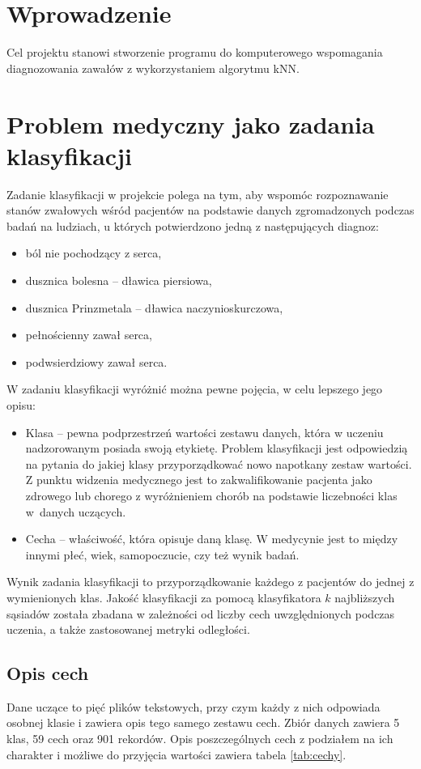 \section{Wprowadzenie}
Cel projektu stanowi stworzenie programu do komputerowego wspomagania diagnozowania zawałów z wykorzystaniem algorytmu kNN.

\section{Problem medyczny jako zadania klasyfikacji}
Zadanie klasyfikacji w projekcie polega na tym, aby wspomóc rozpoznawanie stanów zwałowych wśród pacjentów na podstawie danych zgromadzonych podczas badań na ludziach, u których potwierdzono jedną z następujących diagnoz:

\begin{itemize}
    \item ból nie pochodzący z serca,
    \item dusznica bolesna – dławica piersiowa,
    \item dusznica Prinzmetala – dławica naczynioskurczowa,
    \item pełnościenny zawał serca,
    \item podwsierdziowy zawał serca.
\end{itemize}

\noindent
W zadaniu klasyfikacji wyróżnić można pewne pojęcia, w celu lepszego jego opisu:

\begin{itemize}
    \item Klasa – pewna podprzestrzeń wartości zestawu danych, która w uczeniu nadzorowanym posiada swoją etykietę. Problem klasyfikacji jest odpowiedzią na pytania do jakiej klasy przyporządkować nowo napotkany zestaw wartości. Z punktu widzenia medycznego jest to zakwalifikowanie pacjenta jako zdrowego lub chorego z wyróżnieniem chorób na podstawie liczebności klas w~danych uczących.

    \item Cecha – właściwość, która opisuje daną klasę. W medycynie jest to między innymi płeć, wiek, samopoczucie, czy też wynik badań.
\end{itemize}

Wynik zadania klasyfikacji to przyporządkowanie każdego z pacjentów do jednej z wymienionych klas. Jakość klasyfikacji za pomocą klasyfikatora $k$ najbliższych sąsiadów została zbadana w zależności od liczby cech uwzględnionych podczas uczenia, a także zastosowanej metryki odległości.

\subsection{Opis cech}
Dane uczące to pięć plików tekstowych, przy czym każdy z nich odpowiada osobnej klasie i zawiera opis tego samego zestawu cech. Zbiór danych zawiera 5 klas, 59 cech oraz 901 rekordów. Opis poszczególnych cech z podziałem na ich charakter i możliwe do przyjęcia wartości zawiera tabela \ref{tab:cechy}.


